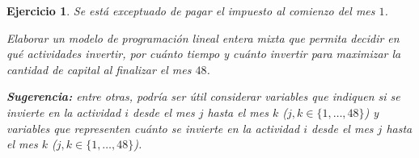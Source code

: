 \documentclass[a4paper,oneside,12pt]{amsart}
\newtheorem{quest}{Ejercicio}
\begin{document}
\begin{quest}
Se está exceptuado de pagar el impuesto al comienzo del mes $1$.

Elaborar un modelo de programación lineal entera mixta que permita decidir en qué actividades invertir, por cuánto tiempo y cuánto invertir para maximizar la cantidad de capital al finalizar el mes $48$.    

\textbf{Sugerencia:} entre otras, podría ser útil considerar variables que indiquen si se invierte en la actividad $i$ desde el mes $j$ hasta el mes $k$ ($j,k\in\{1,\dots, 48\}$) y variables que representen cuánto se invierte en la actividad $i$ desde el mes $j$ hasta el mes $k$ ($j,k\in\{1,\dots, 48\}$).
\end{quest}



\end{document}

